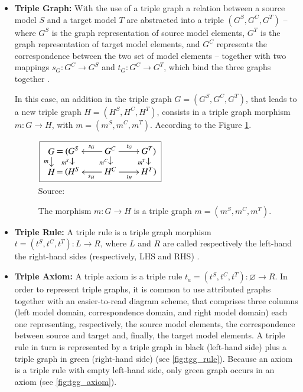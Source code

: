 \documentclass[tuberlin,cic,tc,english,noabntcite,oneside]{iiufrgs}
\begin{document}
\begin{itemize}
	\item \textbf{Triple Graph:} With the use of a triple graph a relation between a source model $S$ and a target model $T$ are abstracted into a triple $(G^S,G^C,G^T)$ – where $G^S$ is the graph representation of source model elements, $G^T$ is the graph representation of target model elements, and $G^C$ represents the correspondence between the two set of model elements – together with two mappings $s_G: G^C \rightarrow G^S$ and $t_G: G^C \rightarrow G^T$, which bind the three graphs together \citep{hermann2011correctness}.
	
	In this case, an addition in the triple graph $G = (G^S,G^C,G^T)$, that leads to a new triple graph $H = (H^S,H^C,H^T)$, consists in a triple graph morphism $m: G \rightarrow H$, with $m = (m^S,m^C,m^T)$. According to the Figure \ref{fig:tg_morphism}.

	\begin{figure}[h]
		\centering
	    \caption{The morphism $m: G \rightarrow H$ is a triple graph $m =  (m^S,m^C,m^T)$.}
	    \includegraphics[width=15em]{tg_morphism}\\
	    Source: \citep{hermann2011correctness}
	    \label{fig:tg_morphism}
	\end{figure}

	\item \textbf{Triple Rule:} A triple rule is a triple graph morphism $t = (t^S,t^C,t^T) : L \rightarrow R$, where $L$ and $R$ are called respectively the left-hand the right-hand sides (respectively, LHS and RHS) \citep{ehrig2007information}.
		
	\item \textbf{Triple Axiom:} A triple axiom is a triple rule $t_a = (t^S,t^C,t^T) : \varnothing \rightarrow R$. In order to represent triple graphs, it is common to use attributed graphs together with an easier-to-read diagram scheme, that comprises three columns (left model domain, correspondence domain, and right model domain) each one representing, respectively, the source model elements, the correspondence between source and target and, finally, the target model elements. A triple rule in turn is represented by a triple graph in black (left-hand side) plus a triple graph in green (right-hand side) (see \ref{fig:tgg_rule}). Because an axiom is a triple rule with empty left-hand side, only green graph occurs in an axiom (see \ref{fig:tgg_axiom}).
	

\end{itemize}
\end{document}
